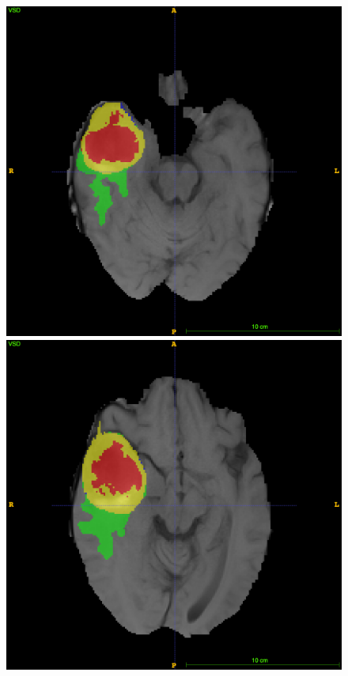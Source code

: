 \documentclass[12pt,a4paper,twoside,openright]{report}
\begin{document}
\begin{figure}[h]
	\includegraphics[scale=0.1]{expert_segmentation_69}
	\includegraphics[scale=0.1]{expert_segmentation_79}

\end{figure}
\end{document}
